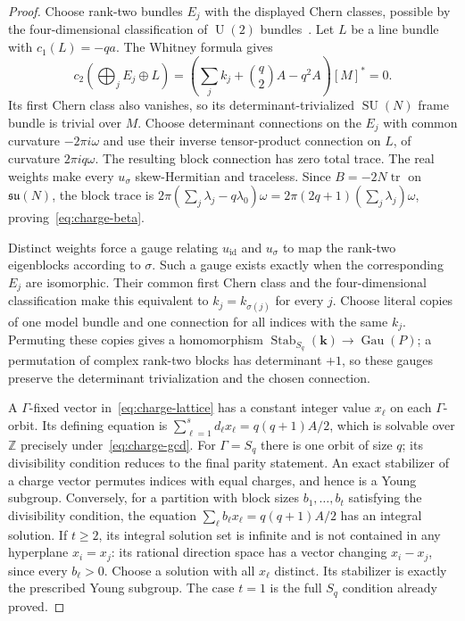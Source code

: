\documentclass[11pt]{amsart}
\newcommand{\Gau}{\operatorname{Gau}}
\newcommand{\SU}{\operatorname{SU}}
\newcommand{\U}{\operatorname{U}}
\newcommand{\Z}{\mathbb Z}
\newcommand{\id}{\operatorname{id}}
\theoremstyle{plain}
\theoremstyle{definition}
\theoremstyle{remark}
\begin{document}
\begin{proof}
Choose rank-two bundles $E_j$ with the displayed Chern classes, possible
by the four-dimensional classification of $\U(2)$ bundles~\cite[Theorem~1.4.20(a)]{GompfStipsicz}. Let $L$ be a
line bundle with $c_1(L)=-qa$. The Whitney formula gives
\[
 c_2\left(\bigoplus_jE_j\oplus L\right)
 =\left(\sum_jk_j+\binom q2 A-q^2A\right)[M]^*=0.
\]
Its first Chern class also vanishes, so its determinant-trivialized
$\SU(N)$ frame bundle is trivial over $M$. Choose determinant connections
on the $E_j$ with common curvature $-2\pi i\omega$ and use their inverse
tensor-product connection on $L$, of curvature $2\pi i q\omega$.
The resulting block connection has zero total trace. The real weights
make every $u_\sigma$
skew-Hermitian and traceless. Since $B=-2N\operatorname{tr}$ on
$\mathfrak{su}(N)$, the block trace is
$2\pi(\sum_j\lambda_j-q\lambda_0)\omega
=2\pi(2q+1)(\sum_j\lambda_j)\omega$, proving~\eqref{eq:charge-beta}.

Distinct weights force a gauge relating $u_{\id}$ and $u_\sigma$ to map
the rank-two eigenblocks according to $\sigma$. Such a gauge exists
exactly when the corresponding $E_j$ are isomorphic. Their common first
Chern class and the four-dimensional classification make this equivalent
to $k_j=k_{\sigma(j)}$ for every $j$. Choose literal copies of one model
bundle and one connection for all indices with the same $k_j$.
Permuting these copies gives a homomorphism
$\operatorname{Stab}_{S_q}(\mathbf k)\to\Gau(P)$; a permutation of
complex rank-two blocks has determinant $+1$, so these gauges preserve
the determinant trivialization and the chosen connection.

A $\Gamma$-fixed vector in~\eqref{eq:charge-lattice} has a constant
integer value $x_\ell$ on each $\Gamma$-orbit. Its defining equation is
$\sum_{\ell=1}^s d_\ell x_\ell=q(q+1)A/2$, which is solvable over
$\Z$ precisely under~\eqref{eq:charge-gcd}. For $\Gamma=S_q$ there is
one orbit of size $q$; its divisibility condition reduces to the final
parity statement.
An exact stabilizer of a charge vector permutes indices with equal
charges, and hence is a Young subgroup. Conversely, for a partition
with block sizes $b_1,\ldots,b_t$ satisfying the divisibility condition,
the equation $\sum_\ell b_\ell x_\ell=q(q+1)A/2$ has an integral
solution. If $t\geq2$, its integral solution set is infinite and is
not contained in any hyperplane $x_i=x_j$: its rational direction
space has a vector changing $x_i-x_j$, since every $b_\ell>0$.
Choose a solution with all $x_\ell$ distinct. Its stabilizer is
exactly the prescribed Young subgroup. The case $t=1$ is the full
$S_q$ condition already proved.
\end{proof}
\end{document}

